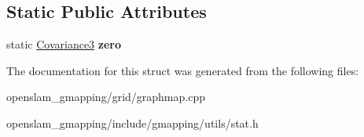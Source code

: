 \subsection*{Static Public Attributes}
\begin{DoxyCompactItemize}
\item 
\mbox{\label{structGMapping_1_1Covariance3_a510c13587cbd1b61e04bfc26f5a7760e}} 
static \hyperlink{structGMapping_1_1Covariance3}{Covariance3} {\bfseries zero}
\end{DoxyCompactItemize}


The documentation for this struct was generated from the following files\+:\begin{DoxyCompactItemize}
\item 
openslam\+\_\+gmapping/grid/graphmap.\+cpp\item 
openslam\+\_\+gmapping/include/gmapping/utils/stat.\+h\end{DoxyCompactItemize}
